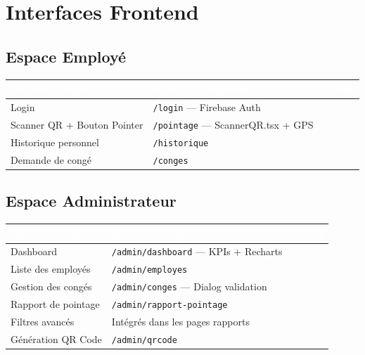 \documentclass[12pt,a4paper]{article}
\newcommand{\cmark}{\textcolor{vert}{\ding{51}}}
\begin{document}
\section{Interfaces Frontend}

\subsection{Espace Employé}

\begin{longtable}{p{4cm} p{5.5cm} c}
\toprule
\rowcolor{headerblue}
\textcolor{white}{\textbf{Interface requise}} & \textcolor{white}{\textbf{Route / Composant}} & \textcolor{white}{\textbf{Statut}} \\
\midrule
\endhead
Login & \texttt{/login} — Firebase Auth & \cmark \\
\midrule
Scanner QR + Bouton Pointer & \texttt{/pointage} — ScannerQR.tsx + GPS & \cmark \\
\midrule
Historique personnel & \texttt{/historique} & \cmark \\
\midrule
Demande de congé & \texttt{/conges} & \cmark \\
\bottomrule
\end{longtable}

\subsection{Espace Administrateur}

\begin{longtable}{p{4cm} p{5.5cm} c}
\toprule
\rowcolor{headerblue}
\textcolor{white}{\textbf{Interface requise}} & \textcolor{white}{\textbf{Route / Composant}} & \textcolor{white}{\textbf{Statut}} \\
\midrule
\endhead
Dashboard & \texttt{/admin/dashboard} — KPIs + Recharts & \cmark \\
\midrule
Liste des employés & \texttt{/admin/employes} & \cmark \\
\midrule
Gestion des congés & \texttt{/admin/conges} — Dialog validation & \cmark \\
\midrule
Rapport de pointage & \texttt{/admin/rapport-pointage} & \cmark \\
\midrule
Filtres avancés & Intégrés dans les pages rapports & \cmark \\
\midrule
Génération QR Code & \texttt{/admin/qrcode} & \cmark \\
\bottomrule
\end{longtable}
\end{document}
